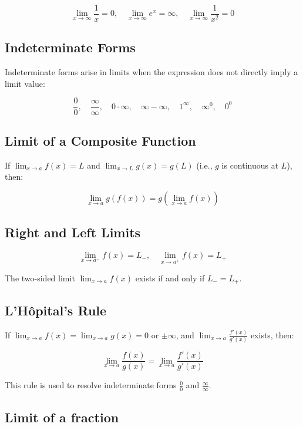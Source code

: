 \[
    \lim_{x \to \infty} \frac{1}{x} = 0, \quad \lim_{x \to \infty} e^x = \infty, \quad \lim_{x \to \infty} \frac{1}{x^2} = 0
\]

\subsection{Indeterminate Forms}

Indeterminate forms arise in limits when the expression does not directly imply a limit value:

\[
    \frac{0}{0}, \quad \frac{\infty}{\infty}, \quad 0 \cdot \infty, \quad \infty - \infty, \quad 1^\infty, \quad \infty^0, \quad 0^0
\]

\subsection{Limit of a Composite Function}

If \(\displaystyle \lim_{x \to a} f(x) = L\) and \(\displaystyle \lim_{x \to L} g(x) = g(L)\) 
(i.e., \(g\) is continuous at \(L\)), then:

\[
    \lim_{x \to a} g(f(x)) = g\left(\lim_{x \to a} f(x)\right)
\]

\subsection{Right and Left Limits}

\[
    \lim_{x \to a^-} f(x) = L_-, \quad \lim_{x \to a^+} f(x) = L_+
\]

The two-sided limit \(\displaystyle \lim_{x \to a} f(x)\) exists if and only if \(L_- = L_+\).

\subsection{L’Hôpital’s Rule}

If \(\displaystyle \lim_{x \to a} f(x) = \lim_{x \to a} g(x) = 0\) or \(\pm\infty\), and \(\displaystyle \lim_{x \to a} \frac{f'(x)}{g'(x)}\) exists, then:

\[
    \lim_{x \to a} \frac{f(x)}{g(x)} = \lim_{x \to a} \frac{f'(x)}{g'(x)}
\]

This rule is used to resolve indeterminate forms \(\frac{0}{0}\) and \(\frac{\infty}{\infty}\).

\subsection{Limit of a fraction}

